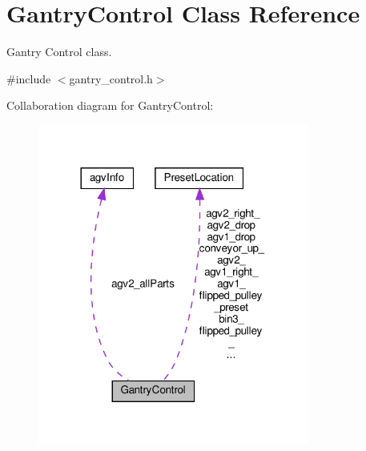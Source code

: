 \hypertarget{classGantryControl}{}\section{Gantry\+Control Class Reference}
\label{classGantryControl}


Gantry Control class.  




{\ttfamily \#include $<$gantry\+\_\+control.\+h$>$}



Collaboration diagram for Gantry\+Control\+:
\nopagebreak
\begin{figure}[H]
\begin{center}
\leavevmode
\includegraphics[width=252pt]{classGantryControl__coll__graph}
\end{center}
\end{figure}
